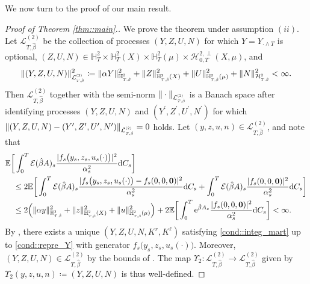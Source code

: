 \documentclass[10pt]{article} %
\newcommand\cE{\mathcal E}
\newcommand\cH{\mathcal H}
\newcommand\cL{\mathcal L}
\newcommand{\smalltext}[1]{\text{\fontsize{4}{4}\selectfont$#1$}}
\def \E{\mathbb{E}}
\def \H{\mathbb{H}}
\newcommand{\1}{\mathbf{1}}
\def\d{\mathrm{d}}
\begin{document}
We now turn to the proof of our main result.

\begin{proof}[Proof of Theorem \ref{thm::main}.]\label{proof::main}
	We prove the theorem under assumption $(ii)$. Let $\cL^{(2)}_{T,\hat\beta}$ be the collection of processes $(Y,Z,U,N)$ for which $Y = Y_{\cdot \land T}$ is optional, $(Z,U,N) \in \H^2_T \times \H^2_T(X) \times \H^2_T(\mu) \times \cH^{2,\perp}_{0,T}(X,\mu)$, and
	\begin{equation*}
		\|(Y,Z,U,N)\|^2_{\cL^\smalltext{(2)}_{\smalltext{T}\smalltext{,}\smalltext{\hat\beta}}} \coloneqq \|\alpha Y\|^2_{\H^\smalltext{2}_{\smalltext{T}\smalltext{,}\smalltext{\hat\beta}}} + \|Z\|^2_{\H^\smalltext{2}_{\smalltext{T}\smalltext{,}\smalltext{\hat\beta}}(X)} + \|U\|^2_{\H^\smalltext{2}_{\smalltext{T}\smalltext{,}\smalltext{\hat\beta}}(\mu)} + \|N\|^2_{\cH^\smalltext{2}_{\smalltext{T}\smalltext{,}\smalltext{\hat\beta}}} < \infty.
	\end{equation*}
	Then $\cL^{(2)}_{T,\hat\beta}$ together with the semi-norm $\|\cdot\|_{\cL^\smalltext{(2)}_{\smalltext{T}\smalltext{,}\smalltext{\hat\beta}}}$ is a Banach space after identifying processes $(Y,Z,U,N)$ and $(Y^\prime,Z^\prime,U^\prime,N^\prime)$ for which $\|(Y,Z,U,N) - (Y^\prime,Z^\prime,U^\prime,N^\prime)\|_{\cL^\smalltext{(2)}_{\smalltext{T}\smalltext{,}\smalltext{\hat\beta}}} = 0$ holds. Let $(y,z,u,n) \in \cL^{(2)}_{T,\hat\beta}$, and note that
	\begin{align*}
		&\E \bigg[ \int_0^T \cE(\hat\beta A)_s \frac{|f_s\big(y_s,z_s,u_s(\cdot)\big)|^2}{\alpha^2_s} \d C_s\bigg] \\ 
		&\quad\leq 2 \E \bigg[ \int_0^T \cE(\hat\beta A)_s \frac{|f_s\big(y_s,z_s,u_s(\cdot)\big) - f_s(0,0,{\bf 0})|^2}{\alpha^2_s} \d C_s 
		+ \int_0^T \cE(\hat\beta A)_s \frac{|f_s(0,0,{\bf 0})|^2}{\alpha^2_s} \d C_s \bigg] \\
		&\quad\leq 2\Big( \|\alpha y\|^2_{\H^\smalltext{2}_{\smalltext{T}\smalltext{,}\smalltext{\hat\beta}}} + \|z\|^2_{\H^\smalltext{2}_{\smalltext{T}\smalltext{,}\smalltext{\hat\beta}}(X)} + \|u\|^2_{\H^\smalltext{2}_{\smalltext{T}\smalltext{,}\smalltext{\hat\beta}}(\mu)}\Big) + 2 \E \bigg[ \int_0^T \mathrm{e}^{\hat\beta A_s} \frac{|f_s(0,0,{\bf 0})|^2}{\alpha^2_s} \d C_s\bigg] < \infty.
	\end{align*}
	By , there exists a unique $(Y,Z,U,N,K^r,K^\ell)$ satisfying \ref{cond::integ_mart} up to \ref{cond::repre_Y} with generator $f_s\big(y_s,z_s,u_s(\cdot)\big)$. Moreover, $(Y,Z,U,N) \in \cL^{(2)}_{T,\hat\beta}$ by the bounds of . The map $\Upsilon_2 : \cL^{(2)}_{T,\hat\beta} \longrightarrow \cL^{(2)}_{T,\hat\beta}$ given by $\Upsilon_2(y, z, u, n) \coloneqq (Y, Z, U, N)$ is thus well-defined. 
	

\end{proof}
\end{document}
